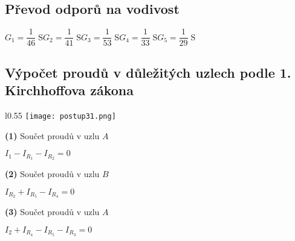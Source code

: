 \documentclass[a4paper,12pt]{article}
\begin{document}
\subsection{Převod odporů na vodivost}\par
$G_1=\dfrac{1}{46}\;\si{\siemens}$\hspace{2em}$G_2=\dfrac{1}{41}\;\si{\siemens}$\hspace{2em}$G_3=\dfrac{1}{53}\;\si{\siemens}$\hspace{2em}$G_4=\dfrac{1}{33}\;\si{\siemens}$\hspace{2em}$G_5=\dfrac{1}{29}\;\si{\siemens}$\par\vspace{-0.2em}
\subsection{Výpočet proudů v důležitých uzlech podle 1. Kirchhoffova zákona}\par
\begin{wrapfigure}{l}{0.55\textwidth}
\vspace{-32pt}
\texttt{[image: postup31.png]}
\vspace{-100pt}
\end{wrapfigure}
\vspace{20pt}
\hspace{1em}\textbf{(1)} Součet proudů v uzlu $A$\par
\hspace{1em}$I_1-I_{R_1}-I_{R_2}=0$\par\vspace{1em}
\hspace{1em}\textbf{(2)} Součet proudů v uzlu $B$\par
\hspace{1em}$I_{R_2}+I_{R_5}-I_{R_4}=0$\par\vspace{1em}
\hspace{1em}\textbf{(3)} Součet proudů v uzlu $A$\par
\hspace{1em}$I_2+I_{R_4}-I_{R_5}-I_{R_3}=0$\par\vspace{1.6em}
\end{document}

